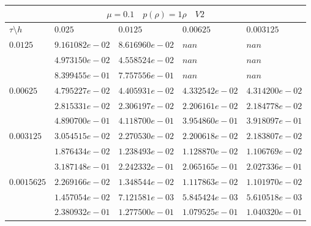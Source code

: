 \documentclass[a4paper,12pt]{extarticle}
\begin{document}
\begin{tabular}{|l|l|l|l|l|}
	\hline
	\multicolumn{5}{|c|}{$\mu =0.1 \quad  p(\rho) =1 \rho \quad V2$}\\
	\hline
	$\tau\setminus h$ & $0.025$ & $0.0125$ & $0.00625$ & $0.003125$\\
	\hline
	$0.0125$  & $9.161082e-02$ & $8.616960e-02$ & $nan$ & $nan$\\
	& $4.973150e-02$ & $4.558524e-02$ & $nan$ & $nan$\\
	& $8.399455e-01$ & $7.757556e-01$ & $nan$ & $nan$\\
	\hline
	$0.00625$  & $4.795227e-02$ & $4.405931e-02$ & $4.332542e-02$ & $4.314200e-02$\\
	& $2.815331e-02$ & $2.306197e-02$ & $2.206161e-02$ & $2.184778e-02$\\
	& $4.890700e-01$ & $4.118700e-01$ & $3.954860e-01$ & $3.918097e-01$\\
	\hline
	$0.003125$  & $3.054515e-02$ & $2.270530e-02$ & $2.200618e-02$ & $2.183807e-02$\\
	& $1.876434e-02$ & $1.238493e-02$ & $1.128870e-02$ & $1.106769e-02$\\
	& $3.187148e-01$ & $2.242332e-01$ & $2.065165e-01$ & $2.027336e-01$\\
	\hline
	$0.0015625$  & $2.269166e-02$ & $1.348544e-02$ & $1.117863e-02$ & $1.101970e-02$\\
	& $1.457054e-02$ & $7.121581e-03$ & $5.845424e-03$ & $5.610518e-03$\\
	& $2.380932e-01$ & $1.277500e-01$ & $1.079525e-01$ & $1.040320e-01$\\
	\hline
\end{tabular}
\end{document}
